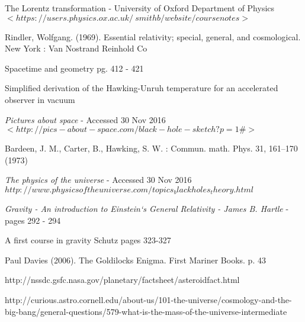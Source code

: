 \begin{thebibliography}{30}



The {Lorentz} transformation - {University} of {Oxford} {Department} of {Physics} 
$<https://users.physics.ox.ac.uk/~smithb/website/coursenotes>$

Rindler, Wolfgang.  (1969).  Essential relativity; special, general, and cosmological.  New York :  Van Nostrand Reinhold Co

Spacetime and geometry
pg. 412 -   421

Simplified derivation of the Hawking-Unruh temperature for an
accelerated observer in vacuum

\textit{Pictures about space} -  Accessed 30 Nov 2016
$<http://pics-about-space.com/black-hole-sketch?p=1\#>$

Bardeen, J. M., Carter, B., Hawking, S. W. : Commun. math. Phys. 31, 161--170 (1973)

\textit{The physics of the universe} -  Accessed 30 Nov 2016
$http://www.physicsoftheuniverse.com/topics_blackholes_theory.html$

\textit{Gravity - An introduction to Einstein`s General Relativity - James B. Hartle} -  pages 292 - 294

A first course in gravity Schutz
pages 323-327

Paul Davies (2006). The Goldilocks Enigma. First Mariner Books. p. 43

http://nssdc.gsfc.nasa.gov/planetary/factsheet/asteroidfact.html

http://curious.astro.cornell.edu/about-us/101-the-universe/cosmology-and-the-big-bang/general-questions/579-what-is-the-mass-of-the-universe-intermediate

\end{thebibliography}